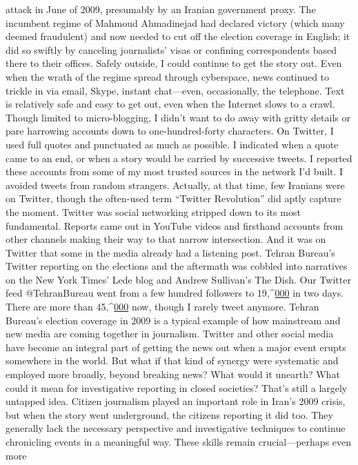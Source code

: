 attack in June of 2009, presumably by an Iranian government proxy. The incumbent
regime of Mahmoud Ahmadinejad had declared victory (which many deemed fraudulent)
and now needed to cut off the election coverage in English; it did so swiftly by canceling
journalists’ visas or confining correspondents based there to their offices. Safely outside,
I could continue to get the story out. Even when the wrath of the regime spread through
cyberspace, news continued to trickle in via email, Skype, instant chat—even,
occasionally, the telephone. Text is relatively safe and easy to get out, even when the
Internet slows to a crawl.
Though limited to micro-blogging, I didn’t want to do away with gritty details or pare
harrowing accounts down to one-hundred-forty characters. On Twitter, I used full quotes
and punctuated as much as possible. I indicated when a quote came to an end, or when a
story would be carried by successive tweets. I reported these accounts from some of my
most trusted sources in the network I’d built. I avoided tweets from random strangers.
Actually, at that time, few Iranians were on Twitter, though the often-used term ``Twitter
Revolution'' did aptly capture the moment. Twitter was social networking stripped down
to its most fundamental. Reports came out in YouTube videos and firsthand accounts
from other channels making their way to that narrow intersection. And it was on Twitter
that some in the media already had a listening post.
Tehran Bureau’s Twitter reporting on the elections and the aftermath was cobbled into
narratives on the New York Times’ Lede blog and Andrew Sullivan’s The Dish. Our
Twitter feed @TehranBureau went from a few hundred followers to 19,^{\href{#endnotes}{000}} in two days.
There are more than 45,^{\href{#endnotes}{000}} now, though I rarely tweet anymore.
Tehran Bureau’s election coverage in 2009 is a typical example of how mainstream and
new media are coming together in journalism. Twitter and other social media have
become an integral part of getting the news out when a major event erupts somewhere in
the world. But what if that kind of synergy were systematic and employed more broadly,
beyond breaking news? What would it unearth? What could it mean for investigative
reporting in closed societies?
That’s still a largely untapped idea. Citizen journalism played an important role in Iran’s
2009 crisis, but when the story went underground, the citizens reporting it did too. They
generally lack the necessary perspective and investigative techniques to continue
chronicling events in a meaningful way. These skills remain crucial—perhaps even more
